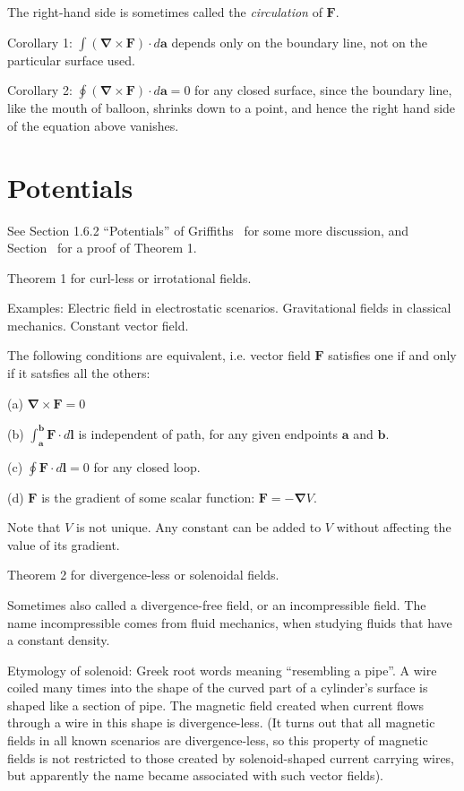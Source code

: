 \documentclass[a4paper]{article}
\theoremstyle{plain}
\theoremstyle{definition}
\newcommand{\vect}[1]{\textbf{#1}}
\newcommand{\del}{\bm{\nabla}}
\begin{document}
The right-hand side is sometimes called the {\em circulation} of
$\vect{F}$.

Corollary 1: $\int (\del \times \vect{F}) \cdot d\vect{a}$ depends
only on the boundary line, not on the particular surface used.

Corollary 2: $\oint (\del \times \vect{F}) \cdot d\vect{a} = 0$ for
any closed surface, since the boundary line, like the mouth of
balloon, shrinks down to a point, and hence the right hand side of the
equation above vanishes.


\section{Potentials}
\label{sec:potentials}

See Section 1.6.2 ``Potentials'' of Griffiths~\cite{Griffiths1998} for
some more discussion, and Section~\cite{sec:potentialsthm1} for
a proof of Theorem 1.

Theorem 1 for curl-less or irrotational fields.

Examples: Electric field in electrostatic scenarios.  Gravitational
fields in classical mechanics.  Constant vector field.

The following conditions are equivalent, i.e. vector field $\vect{F}$
satisfies one if and only if it satsfies all the others:

(a) $\del \times \vect{F} = 0$

(b) $\int_{\vect{a}}^{\vect{b}} \vect{F} \cdot d\vect{l}$ is
independent of path, for any given endpoints $\vect{a}$ and
$\vect{b}$.

(c) $\oint \vect{F} \cdot d\vect{l} = 0$ for any closed loop.

(d) $\vect{F}$ is the gradient of some scalar function: $\vect{F} =
-\del V$.

Note that $V$ is not unique.  Any constant can be added to $V$ without
affecting the value of its gradient.

Theorem 2 for divergence-less or solenoidal fields.

Sometimes also called a divergence-free field, or an incompressible
field.  The name incompressible comes from fluid mechanics, when
studying fluids that have a constant density.

Etymology of solenoid: Greek root words meaning ``resembling a pipe''.
A wire coiled many times into the shape of the curved part of a
cylinder's surface is shaped like a section of pipe.  The magnetic
field created when current flows through a wire in this shape is
divergence-less.  (It turns out that all magnetic fields in all known
scenarios are divergence-less, so this property of magnetic fields is
not restricted to those created by solenoid-shaped current carrying
wires, but apparently the name became associated with such vector
fields).
\end{document}
